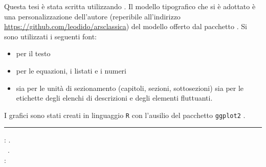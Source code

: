
\clearpage
{}
\thispagestyle{empty}

\hfill

\vfill

\noindent
Questa tesi è stata scritta utilizzando \ctLaTeX{}. Il modello tipografico che si è adottato è una personalizzazione dell'autore (reperibile all'indirizzo \url{https://github.com/leodido/arsclassica}) del modello offerto dal pacchetto \href{http://www.ctan.org/tex-archive/macros/latex/contrib/arsclassica}{\arsclassica{}}.
Si sono utilizzati i seguenti font:
\begin{itemize}
	\item {} per il testo
	\item {}\rmfamily{} per le equazioni, i listati e i numeri
	\item {}\rmfamily{} sia per le unità di sezionamento (capitoli, sezioni, sottosezioni) sia per le etichette degli elenchi di descrizioni e degli elementi fluttuanti.
\end{itemize}

\noindent
I grafici sono stati creati in linguaggio \lstinline$R$ \citep{R2013} con l'ausilio del pacchetto \lstinline$ggplot2$ \citep{GGPLOT2009}.

\vspace{.2cm}
\hrule
\bigskip

\noindent\myname: \textit{\mytitle}. \\
\mydegree \hspace{1px} \textcopyright\ \MakeTextLowercase{\mytime}. \\

\medskip
{}: \\
 \\
